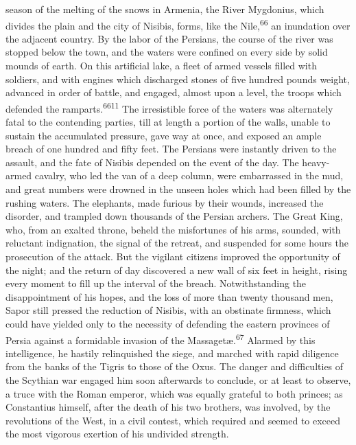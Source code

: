 season of the melting of the snows in Armenia, the River
Mygdonius, which divides the plain and the city of Nisibis,
forms, like the Nile,\textsuperscript{66} an inundation over the adjacent country.
By the labor of the Persians, the course of the river was stopped
below the town, and the waters were confined on every side by
solid mounds of earth. On this artificial lake, a fleet of armed
vessels filled with soldiers, and with engines which discharged
stones of five hundred pounds weight, advanced in order of
battle, and engaged, almost upon a level, the troops which
defended the ramparts.\textsuperscript{6611} The irresistible force of the waters
was alternately fatal to the contending parties, till at length a
portion of the walls, unable to sustain the accumulated pressure,
gave way at once, and exposed an ample breach of one hundred and
fifty feet. The Persians were instantly driven to the assault,
and the fate of Nisibis depended on the event of the day. The
heavy-armed cavalry, who led the van of a deep column, were
embarrassed in the mud, and great numbers were drowned in the
unseen holes which had been filled by the rushing waters. The
elephants, made furious by their wounds, increased the disorder,
and trampled down thousands of the Persian archers. The Great
King, who, from an exalted throne, beheld the misfortunes of his
arms, sounded, with reluctant indignation, the signal of the
retreat, and suspended for some hours the prosecution of the
attack. But the vigilant citizens improved the opportunity of the
night; and the return of day discovered a new wall of six feet in
height, rising every moment to fill up the interval of the
breach. Notwithstanding the disappointment of his hopes, and the
loss of more than twenty thousand men, Sapor still pressed the
reduction of Nisibis, with an obstinate firmness, which could
have yielded only to the necessity of defending the eastern
provinces of Persia against a formidable invasion of the
Massagetæ.\textsuperscript{67} Alarmed by this intelligence, he hastily
relinquished the siege, and marched with rapid diligence from the
banks of the Tigris to those of the Oxus. The danger and
difficulties of the Scythian war engaged him soon afterwards to
conclude, or at least to observe, a truce with the Roman emperor,
which was equally grateful to both princes; as Constantius
himself, after the death of his two brothers, was involved, by
the revolutions of the West, in a civil contest, which required
and seemed to exceed the most vigorous exertion of his undivided
strength.

